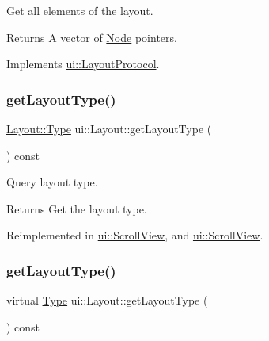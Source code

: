 Get all elements of the layout. 

\begin{DoxyReturn}{Returns}
A vector of \hyperlink{classNode}{Node} pointers. 
\end{DoxyReturn}


Implements \hyperlink{classui_1_1LayoutProtocol_acd689e1718c903c7e9ed3277eb83b97c}{ui\+::\+Layout\+Protocol}.

\mbox{\label{classui_1_1Layout_a4eaf95d303163cfd1064575625c95b33}} 
\subsubsection{\texorpdfstring{get\+Layout\+Type()}{getLayoutType()}\hspace{0.1cm}{\footnotesize\ttfamily [1/2]}}
{\footnotesize\ttfamily \hyperlink{classui_1_1Layout_aecabbc1592677eadd6757edc1df5b952}{Layout\+::\+Type} ui\+::\+Layout\+::get\+Layout\+Type (\begin{DoxyParamCaption}{ }\end{DoxyParamCaption}) const\hspace{0.3cm}{\ttfamily [virtual]}}

Query layout type. \begin{DoxyReturn}{Returns}
Get the layout type. 
\end{DoxyReturn}


Reimplemented in \hyperlink{classui_1_1ScrollView_a580fc58c93a299b55fc3c25ab96d22cf}{ui\+::\+Scroll\+View}, and \hyperlink{classui_1_1ScrollView_a437befb0a341d9f9c2278e3f119a1af7}{ui\+::\+Scroll\+View}.

\mbox{\label{classui_1_1Layout_a4b2cf55b05b21bc57aa4ce0da286f149}} 
\subsubsection{\texorpdfstring{get\+Layout\+Type()}{getLayoutType()}\hspace{0.1cm}{\footnotesize\ttfamily [2/2]}}
{\footnotesize\ttfamily virtual \hyperlink{classui_1_1Layout_aecabbc1592677eadd6757edc1df5b952}{Type} ui\+::\+Layout\+::get\+Layout\+Type (\begin{DoxyParamCaption}{ }\end{DoxyParamCaption}) const\hspace{0.3cm}{\ttfamily [virtual]}}

